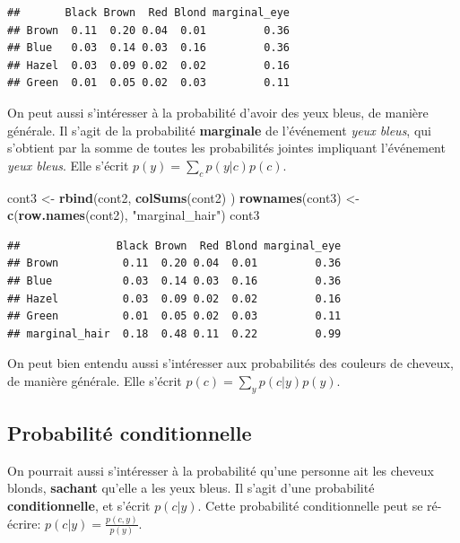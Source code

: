 \documentclass[
  a4paper,11pt,twoside,onecolumn,openright,final,oldfontcommands]{memoir}
\newenvironment{Shaded}{\begin{snugshade}}{\end{snugshade}}
\newcommand{\KeywordTok}[1]{\textcolor[rgb]{0.13,0.29,0.53}{\textbf{#1}}}
\newcommand{\NormalTok}[1]{#1}
\newcommand{\StringTok}[1]{\textcolor[rgb]{0.31,0.60,0.02}{#1}}
\theoremstyle{definition}
\theoremstyle{definition}
\theoremstyle{definition}
\theoremstyle{remark}
\begin{document}
\begin{verbatim}
##       Black Brown  Red Blond marginal_eye
## Brown  0.11  0.20 0.04  0.01         0.36
## Blue   0.03  0.14 0.03  0.16         0.36
## Hazel  0.03  0.09 0.02  0.02         0.16
## Green  0.01  0.05 0.02  0.03         0.11
\end{verbatim}

On peut aussi s'intéresser à la probabilité d'avoir des yeux bleus, de manière générale. Il s'agit de la probabilité \textbf{marginale} de l'événement \emph{yeux bleus}, qui s'obtient par la somme de toutes les probabilités jointes impliquant l'événement \emph{yeux bleus}. Elle s'écrit \(p(y)=\sum\limits_{c}p(y|c)p(c)\).

\begin{Shaded}
\begin{Highlighting}[]
\NormalTok{cont3 \textless{}{-}}\StringTok{ }\KeywordTok{rbind}\NormalTok{(cont2, }\KeywordTok{colSums}\NormalTok{(cont2) )}
\KeywordTok{rownames}\NormalTok{(cont3) \textless{}{-}}\StringTok{ }\KeywordTok{c}\NormalTok{(}\KeywordTok{row.names}\NormalTok{(cont2), }\StringTok{"marginal\_hair"}\NormalTok{)}
\NormalTok{cont3}
\end{Highlighting}
\end{Shaded}

\begin{verbatim}
##               Black Brown  Red Blond marginal_eye
## Brown          0.11  0.20 0.04  0.01         0.36
## Blue           0.03  0.14 0.03  0.16         0.36
## Hazel          0.03  0.09 0.02  0.02         0.16
## Green          0.01  0.05 0.02  0.03         0.11
## marginal_hair  0.18  0.48 0.11  0.22         0.99
\end{verbatim}

On peut bien entendu aussi s'intéresser aux probabilités des couleurs de cheveux, de manière générale. Elle s'écrit \(p(c)=\sum\limits_{y}p(c|y)p(y)\).

\hypertarget{probabilituxe9-conditionnelle}{%
\subsection{Probabilité conditionnelle}\label{probabilituxe9-conditionnelle}}

On pourrait aussi s'intéresser à la probabilité qu'une personne ait les cheveux blonds, \textbf{sachant} qu'elle a les yeux bleus. Il s'agit d'une probabilité \textbf{conditionnelle}, et s'écrit \(p(c|y)\). Cette probabilité conditionnelle peut se ré-écrire: \(p(c|y)= \frac{p(c,y)}{p(y)}\).
\end{document}
